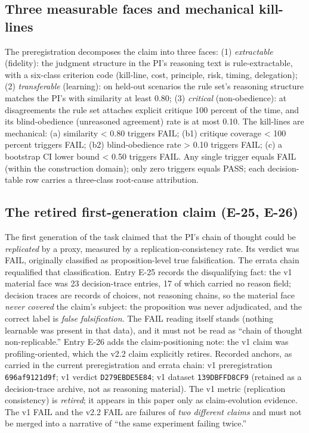 \documentclass[11pt]{article}
\newcommand{\sha}[1]{\texttt{#1}}
\begin{document}
\subsection{Three measurable faces and mechanical kill-lines}
\noindent The preregistration decomposes the claim into three faces: (1) \emph{extractable} (fidelity): the judgment structure in the PI's reasoning text is rule-extractable, with a six-class criterion code (kill-line, cost, principle, risk, timing, delegation); (2) \emph{transferable} (learning): on held-out scenarios the rule set's reasoning structure matches the PI's with similarity at least 0.80; (3) \emph{critical} (non-obedience): at disagreements the rule set attaches explicit critique 100 percent of the time, and its blind-obedience (unreasoned agreement) rate is at most 0.10. The kill-lines are mechanical: (a) similarity < 0.80 triggers FAIL; (b1) critique coverage < 100 percent triggers FAIL; (b2) blind-obedience rate > 0.10 triggers FAIL; (c) a bootstrap CI lower bound < 0.50 triggers FAIL. Any single trigger equals FAIL (within the construction domain); only zero triggers equals PASS; each decision-table row carries a three-class root-cause attribution.\par
\subsection{The retired first-generation claim (E-25, E-26)}
\noindent The first generation of the task claimed that the PI's chain of thought could be \emph{replicated} by a proxy, measured by a replication-consistency rate. Its verdict was FAIL, originally classified as proposition-level true falsification. The errata chain requalified that classification. Entry E-25 records the disqualifying fact: the v1 material face was 23 decision-trace entries, 17 of which carried no reason field; decision traces are records of choices, not reasoning chains, so the material face \emph{never covered} the claim's subject: the proposition was never adjudicated, and the correct label is \emph{false falsification}. The FAIL reading itself stands (nothing learnable was present in that data), and it must not be read as ``chain of thought non-replicable.'' Entry E-26 adds the claim-positioning note: the v1 claim was profiling-oriented, which the v2.2 claim explicitly retires. Recorded anchors, as carried in the current preregistration and errata chain: v1 preregistration \texttt{696af9121d9f}; v1 verdict \sha{D279EBDE5E84}; v1 dataset \sha{139DBFFD8CF9} (retained as a decision-trace archive, not as reasoning material). The v1 metric (replication consistency) is \emph{retired}; it appears in this paper only as claim-evolution evidence. The v1 FAIL and the v2.2 FAIL are failures of \emph{two different claims} and must not be merged into a narrative of ``the same experiment failing twice.''\par
\end{document}
